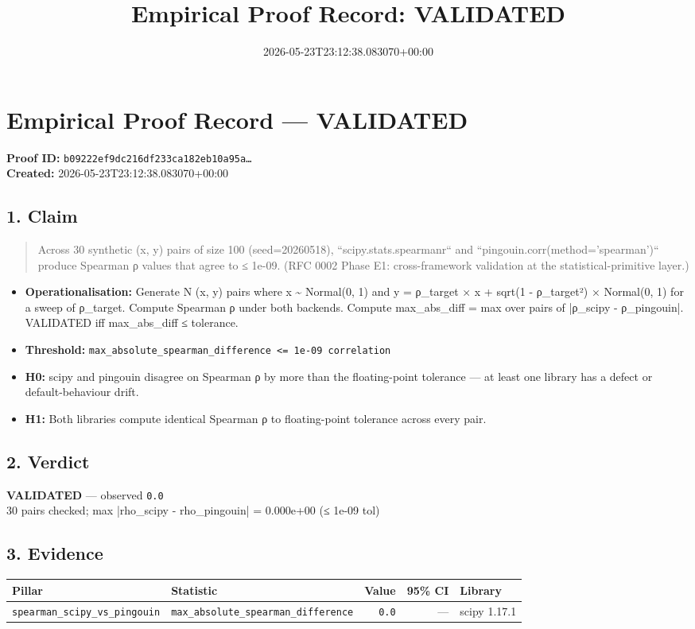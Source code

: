 \documentclass{article}
\title{Empirical Proof Record: VALIDATED}
\date{2026-05-23T23:12:38.083070+00:00}
\begin{document}
\maketitle
\section*{Empirical Proof Record --- \textcolor{validated}{\textbf{VALIDATED}}}
\textbf{Proof ID:} \texttt{b09222ef9dc216df233ca182eb10a95a\dots}\\
\textbf{Created:} 2026-05-23T23:12:38.083070+00:00
\subsection*{1. Claim}
\begin{quote}Across 30 synthetic (x, y) pairs of size 100 (seed=20260518), ``scipy.stats.spearmanr`` and ``pingouin.corr(method='spearman')`` produce Spearman ρ values that agree to ≤ 1e-09. (RFC 0002 Phase E1: cross-framework validation at the statistical-primitive layer.)\end{quote}
\begin{itemize}
\item \textbf{Operationalisation:} Generate N (x, y) pairs where x \textasciitilde{} Normal(0, 1) and y = ρ\_target × x + sqrt(1 - ρ\_target²) × Normal(0, 1) for a sweep of ρ\_target. Compute Spearman ρ under both backends. Compute max\_abs\_diff = max over pairs of |ρ\_scipy - ρ\_pingouin|. VALIDATED iff max\_abs\_diff ≤ tolerance.
\item \textbf{Threshold:} \texttt{max\_absolute\_spearman\_difference <= 1e-09 correlation}
\item \textbf{H0:} scipy and pingouin disagree on Spearman ρ by more than the floating-point tolerance — at least one library has a defect or default-behaviour drift.
\item \textbf{H1:} Both libraries compute identical Spearman ρ to floating-point tolerance across every pair.
\end{itemize}
\subsection*{2. Verdict}
\textcolor{validated}{\textbf{VALIDATED}} --- observed \texttt{0.0}\\
30 pairs checked; max |rho\_scipy - rho\_pingouin| = 0.000e+00 (≤ 1e-09 tol)
\subsection*{3. Evidence}
\begin{tabular}{llrrl}\toprule
\textbf{Pillar} & \textbf{Statistic} & \textbf{Value} & \textbf{95\% CI} & \textbf{Library} \\\midrule
\texttt{spearman\_scipy\_vs\_pingouin} & \texttt{max\_absolute\_spearman\_difference} & \texttt{0.0} & --- & scipy 1.17.1 \\
\bottomrule\end{tabular}
\end{document}
